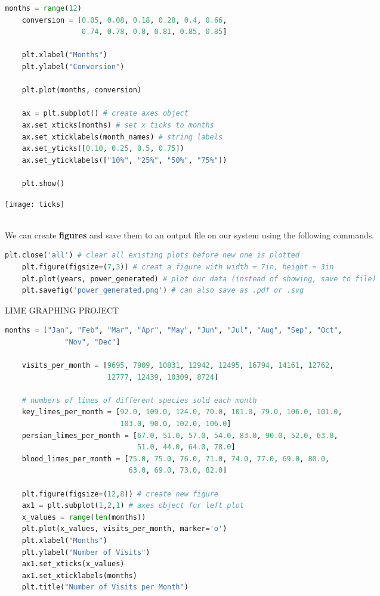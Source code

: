\documentclass[11pt, a4paper]{article}
\begin{document}
\begin{spacing}{1.1}
\begin{minipage}[c]{10cm}
\begin{lstlisting}[language=Python]
	months = range(12)
	conversion = [0.05, 0.08, 0.18, 0.28, 0.4, 0.66, 
	              0.74, 0.78, 0.8, 0.81, 0.85, 0.85]
	
	plt.xlabel("Months")
	plt.ylabel("Conversion")
	
	plt.plot(months, conversion)
	
	ax = plt.subplot() # create axes object
	ax.set_xticks(months) # set x ticks to months
	ax.set_xticklabels(month_names) # string labels
	ax.set_yticks([0.10, 0.25, 0.5, 0.75])
	ax.set_yticklabels(["10%", "25%", "50%", "75%"])
	
	plt.show() \end{lstlisting}\vspace*{1mm}
	\end{minipage}
	\begin{minipage}[c]{7cm}
		\texttt{[image: ticks]}
	\end{minipage} \\
	We can create \textbf{figures} and save them to an output file on our system using the following commands.
	\begin{lstlisting}[language=Python]
	plt.close('all') # clear all existing plots before new one is plotted
	plt.figure(figsize=(7,3)) # creat a figure with width = 7in, height = 3in
	plt.plot(years, power_generated) # plot our data (instead of showing, save to file)
	plt.savefig('power_generated.png') # can also save as .pdf or .svg \end{lstlisting} \newpage
	\noindent LIME GRAPHING PROJECT
	\begin{lstlisting}[language=Python]
	months = ["Jan", "Feb", "Mar", "Apr", "May", "Jun", "Jul", "Aug", "Sep", "Oct", 
	          "Nov", "Dec"]
	
	visits_per_month = [9695, 7909, 10831, 12942, 12495, 16794, 14161, 12762, 
	                    12777, 12439, 10309, 8724]
	
	# numbers of limes of different species sold each month
	key_limes_per_month = [92.0, 109.0, 124.0, 70.0, 101.0, 79.0, 106.0, 101.0, 
	                       103.0, 90.0, 102.0, 106.0]
	persian_limes_per_month = [67.0, 51.0, 57.0, 54.0, 83.0, 90.0, 52.0, 63.0, 
	                           51.0, 44.0, 64.0, 78.0]
	blood_limes_per_month = [75.0, 75.0, 76.0, 71.0, 74.0, 77.0, 69.0, 80.0, 
	                         63.0, 69.0, 73.0, 82.0]
	
	plt.figure(figsize=(12,8)) # create new figure
	ax1 = plt.subplot(1,2,1) # axes object for left plot
	x_values = range(len(months))
	plt.plot(x_values, visits_per_month, marker='o')
	plt.xlabel("Months")
	plt.ylabel("Number of Visits")
	ax1.set_xticks(x_values)
	ax1.set_xticklabels(months)
	plt.title("Number of Visits per Month")
	

\end{lstlisting}
\end{spacing}
\end{document}
